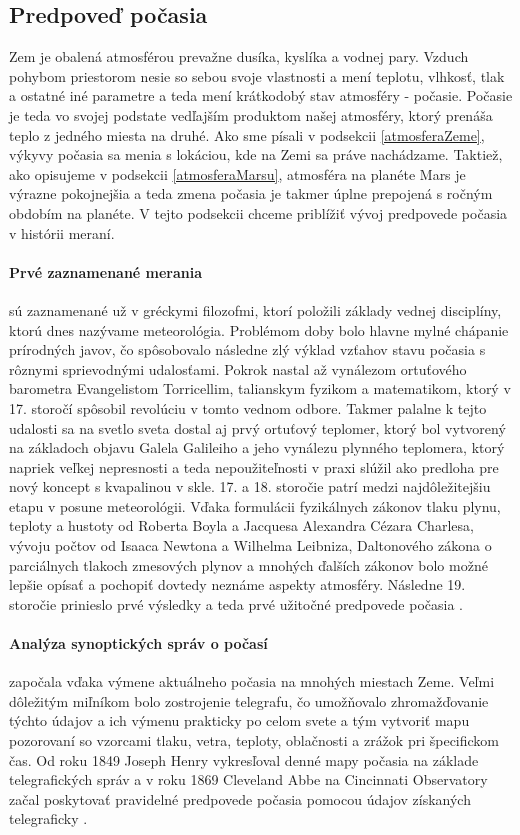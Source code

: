 \newpage
\subsection{Predpoveď počasia}
Zem je obalená atmosférou prevažne dusíka, kyslíka a vodnej pary. Vzduch pohybom priestorom nesie so sebou svoje vlastnosti a mení teplotu, vlhkosť, tlak a ostatné iné parametre a teda mení krátkodobý stav atmosféry - počasie. Počasie je teda vo svojej podstate vedľajším produktom našej atmosféry, ktorý prenáša teplo z jedného miesta na druhé.
Ako sme písali v podsekcii \ref{atmosferaZeme}, výkyvy počasia sa menia s lokáciou, kde na Zemi sa práve nachádzame. Taktiež, ako opisujeme v podsekcii \ref{atmosferaMarsu}, atmosféra na planéte Mars je výrazne pokojnejšia a teda zmena počasia je takmer úplne prepojená s ročným obdobím na planéte.
V tejto podsekcii chceme priblížiť vývoj predpovede počasia v histórii meraní.

\paragraph{Prvé zaznamenané merania} sú zaznamenané už v gréckymi filozofmi, ktorí položili základy vednej disciplíny, ktorú dnes nazývame meteorológia. Problémom doby bolo hlavne mylné chápanie prírodných javov, čo spôsobovalo následne zlý výklad vzťahov stavu počasia s rôznymi sprievodnými udalosťami. Pokrok nastal až vynálezom ortuťového barometra Evangelistom Torricellim, talianskym fyzikom a matematikom, ktorý v 17. storočí spôsobil revolúciu v tomto vednom odbore. Takmer palalne k tejto udalosti sa na svetlo sveta dostal aj prvý ortuťový teplomer, ktorý bol vytvorený na základoch objavu Galela Galileiho a jeho vynálezu plynného teplomera, ktorý napriek veľkej nepresnosti a teda nepoužiteľnosti v praxi slúžil ako predloha pre nový koncept s kvapalinou v skle.
17. a 18. storočie patrí medzi najdôležitejšiu etapu v posune meteorológii. Vďaka formulácii fyzikálnych zákonov tlaku plynu, teploty a hustoty od Roberta Boyla a Jacquesa Alexandra Cézara Charlesa, vývoju počtov od Isaaca Newtona a Wilhelma Leibniza, Daltonového zákona o parciálnych tlakoch zmesových plynov a mnohých ďalších zákonov bolo možné lepšie opísať a pochopiť dovtedy neznáme aspekty atmosféry. Následne 19. storočie prinieslo prvé výsledky a teda prvé užitočné predpovede počasia \cite{meteo}.

\paragraph{Analýza synoptických správ o počasí} započala vďaka výmene aktuálneho počasia na mnohých miestach Zeme. Veľmi dôležitým miľníkom bolo zostrojenie telegrafu, čo umožňovalo zhromažďovanie týchto údajov a ich výmenu prakticky po celom svete a tým vytvoriť mapu pozorovaní so vzorcami tlaku, vetra, teploty, oblačnosti a zrážok pri špecifickom čas. Od roku 1849 Joseph Henry vykresľoval denné mapy počasia na základe telegrafických správ a v roku 1869 Cleveland Abbe na Cincinnati Observatory začal poskytovať pravidelné predpovede počasia pomocou údajov získaných telegraficky \cite{meteo}.


